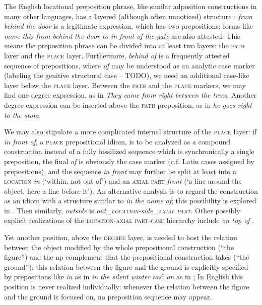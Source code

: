 \documentclass[UTF8, a4paper, oneside, scheme=plain, 12pt]{ctexbook}
\newcommand{\form}[1]{\emph{#1}}
\newcommand{\category}[1]{\textsc{#1}}
\newcommand{\translate}[1]{`#1'}
\begin{document}
The English locational preposition phrase, 
like similar adposition constructions in many other languages, 
has a layered (although often unnoticed) structure \citep{spatialpp}:
\form{from behind the door} is a legitimate expression, which has two prepositions;
forms like \form{move this from behind the door to in front of the gate}
are also attested.
This means the preposition phrase can be divided into at least two layers:
the \category{path} layer and the \category{place} layer.
Furthermore, \form{behind of} is a frequently attested sequence of prepositions,
where \form{of} may be understood as an analytic case marker
(labeling the genitive structural case -- TODO), 
we need an additional case-like layer below the \category{place} layer.
Between the \category{path} and the \category{place} markers, 
we may find one degree expression, as in 
\form{They came from right between the trees.}
Another degree expression can be inserted above the \category{path} preposition,
as in \form{he goes right to the store}.

We may also stipulate a more complicated internal structure of the \category{place} layer:
if \form{in front of}, a \category{place} prepositional idiom, 
is to be analyzed as a compound construction
instead of a fully fossilized sequence which is synchronically a single preposition,
the final \form{of} is obviously the case marker 
(c.f. Latin cases assigned by prepositions),
and the sequence \form{in front} may further be split at least into 
a \category{location} \form{in} (\translate{within, not out of}) 
and an \category{axial part} \form{front} (\translate{a line around the object, here a line before it}).
An alternative analysis is to regard the construction as an idiom 
with a structure similar to \form{in the name of};
this possibility is explored in .
Then similarly, \form{outside} is \form{out_{\category{location}}-side_{\category{axial part}}}.
Other possibly explicit realizations of the 
\category{location}-\category{axial part}-\category{case} hierarchy
include \form{on top of} \citep{spatialpp}.

Yet another position, above the \category{degree} layer, is needed 
to host the relation between the object modified by the whole prepositional construction
(``the figure'')
and the \acs{np} complement that the prepositional construction takes (``the ground''):
this relation between the figure and the ground 
is explicitly specified by prepositions like \form{in} as in \form{in the silent winter}
and \form{on} as in \form{};
In English this position is never realized individually:
whenever the relation between the figure and the ground is focused on, 
no preposition sequence may appear. 
\end{document}
